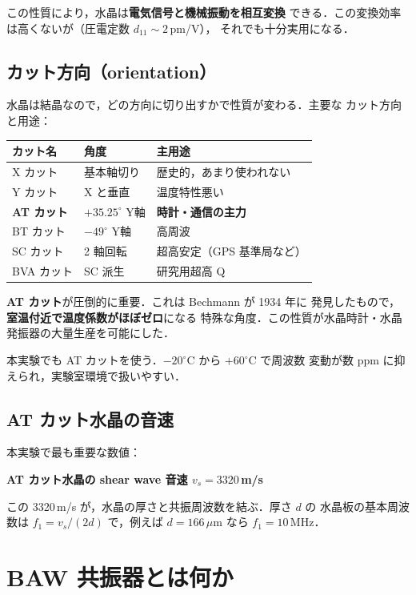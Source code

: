 \documentclass[11pt,a4paper]{article}
\begin{document}
この性質により，水晶は\textbf{電気信号と機械振動を相互変換}
できる．この変換効率は高くないが（圧電定数 $d_{11} \sim 2$\,pm/V），
それでも十分実用になる．

\subsection{カット方向（orientation）}

水晶は結晶なので，どの方向に切り出すかで性質が変わる．主要な
カット方向と用途：

\begin{center}
\begin{tabular}{lll}
\toprule
カット名 & 角度 & 主用途 \\
\midrule
X カット & 基本軸切り & 歴史的，あまり使われない \\
Y カット & X と垂直 & 温度特性悪い \\
\textbf{AT カット} & $+35.25^\circ$ Y軸 & \textbf{時計・通信の主力} \\
BT カット & $-49^\circ$ Y軸 & 高周波 \\
SC カット & 2 軸回転 & 超高安定（GPS 基準局など）\\
BVA カット & SC 派生 & 研究用超高 Q \\
\bottomrule
\end{tabular}
\end{center}

\textbf{AT カット}が圧倒的に重要．これは Bechmann が 1934 年に
発見したもので，\textbf{室温付近で温度係数がほぼゼロ}になる
特殊な角度．この性質が水晶時計・水晶発振器の大量生産を可能にした．

本実験でも AT カットを使う．$-20^\circ$C から $+60^\circ$C で周波数
変動が数 ppm に抑えられ，実験室環境で扱いやすい．

\subsection{AT カット水晶の音速}

本実験で最も重要な数値：
\begin{center}
\Large
\textbf{AT カット水晶の shear wave 音速 $v_s = 3320$\,m/s}
\end{center}

この 3320\,m/s が，水晶の厚さと共振周波数を結ぶ．厚さ $d$ の
水晶板の基本周波数は $f_1 = v_s/(2d)$ で，例えば $d = 166\,\mu$m
なら $f_1 = 10\,$MHz．

\section{BAW 共振器とは何か}
\end{document}

